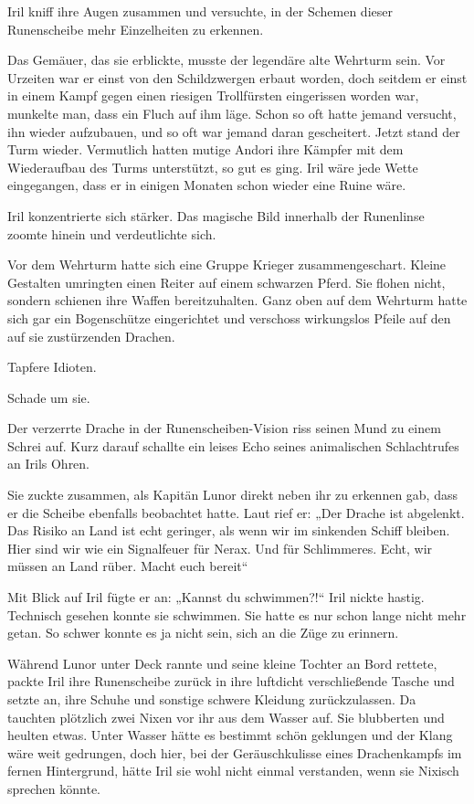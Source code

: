 Iril kniff ihre Augen zusammen und versuchte, in der Schemen dieser Runenscheibe mehr Einzelheiten zu erkennen.

Das Gemäuer, das sie erblickte, musste der legendäre alte Wehrturm sein. Vor Urzeiten war er einst von den Schildzwergen erbaut worden, doch seitdem er einst in einem Kampf gegen einen riesigen Trollfürsten eingerissen worden war, munkelte man, dass ein Fluch auf ihm läge. Schon so oft hatte jemand versucht, ihn wieder aufzubauen, und so oft war jemand daran gescheitert. Jetzt stand der Turm wieder. Vermutlich hatten mutige Andori ihre Kämpfer mit dem Wiederaufbau des Turms unterstützt, so gut es ging. Iril wäre jede Wette eingegangen, dass er in einigen Monaten schon wieder eine Ruine wäre.

Iril konzentrierte sich stärker. Das magische Bild innerhalb der Runenlinse zoomte hinein und verdeutlichte sich.

Vor dem Wehrturm hatte sich eine Gruppe Krieger zusammengeschart. Kleine Gestalten umringten einen Reiter auf einem schwarzen Pferd. Sie flohen nicht, sondern schienen ihre Waffen bereitzuhalten. Ganz oben auf dem Wehrturm hatte sich gar ein Bogenschütze eingerichtet und verschoss wirkungslos Pfeile auf den auf sie zustürzenden Drachen.

Tapfere Idioten.

Schade um sie.

Der verzerrte Drache in der Runenscheiben-Vision riss seinen Mund zu einem Schrei auf. Kurz darauf schallte ein leises Echo seines animalischen Schlachtrufes an Irils Ohren.

Sie zuckte zusammen, als Kapitän Lunor direkt neben ihr zu erkennen gab, dass er die Scheibe ebenfalls beobachtet hatte. Laut rief er: „Der Drache ist abgelenkt. Das Risiko an Land ist echt geringer, als wenn wir im sinkenden Schiff bleiben. Hier sind wir wie ein Signalfeuer für Nerax. Und für Schlimmeres. Echt, wir müssen an Land rüber. Macht euch bereit“

Mit Blick auf Iril fügte er an: „Kannst du schwimmen?!“ Iril nickte hastig. Technisch gesehen konnte sie schwimmen. Sie hatte es nur schon lange nicht mehr getan. So schwer konnte es ja nicht sein, sich an die Züge zu erinnern.

Während Lunor unter Deck rannte und seine kleine Tochter an Bord rettete, packte Iril ihre Runenscheibe zurück in ihre luftdicht verschließende Tasche und setzte an, ihre Schuhe und sonstige schwere Kleidung zurückzulassen. Da tauchten plötzlich zwei Nixen vor ihr aus dem Wasser auf. Sie blubberten und heulten etwas. Unter Wasser hätte es bestimmt schön geklungen und der Klang wäre weit gedrungen, doch hier, bei der Geräuschkulisse eines Drachenkampfs im fernen Hintergrund, hätte Iril sie wohl nicht einmal verstanden, wenn sie Nixisch sprechen könnte.

